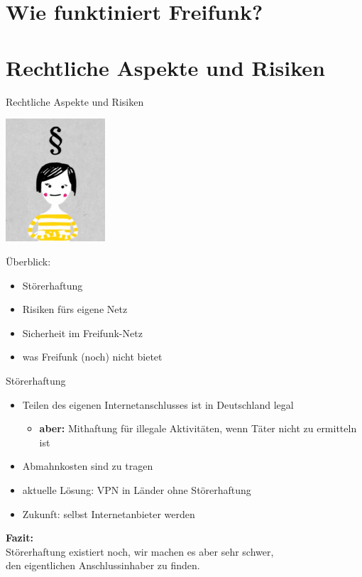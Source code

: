 \documentclass[handout]{beamer}
\begin{document}
\section{Wie funktiniert Freifunk?}

\section{Rechtliche Aspekte und Risiken}
\begin{frame}{Rechtliche Aspekte und Risiken}
\begin{Row}
\begin{Cell}{1}
\vspace{0.1cm}
\includegraphics[width=3.7cm]{images/recht}
\end{Cell}
\begin{Cell}{2}
\vspace{1cm}
Überblick:
\begin{itemize}
\pause \item Störerhaftung
\pause \item Risiken fürs eigene Netz
\pause \item Sicherheit im Freifunk-Netz
\pause \item was Freifunk (noch) nicht bietet
\end{itemize}
\end{Cell}
\end{Row}
\end{frame}

\begin{frame}{Störerhaftung}
\begin{itemize}
\pause\item Teilen des eigenen Internetanschlusses ist in Deutschland legal
\begin{itemize}
	\pause\item \textbf{aber:} Mithaftung für illegale Aktivitäten, wenn Täter nicht zu ermitteln ist
\end{itemize}
\pause\item Abmahnkosten sind zu tragen
\vfill
\pause\item aktuelle Lösung: VPN in Länder ohne Störerhaftung
\pause\item Zukunft: selbst Internetanbieter werden
\end{itemize}
\vfill
\centering
\pause \textbf{Fazit:}\\Störerhaftung existiert noch, wir machen es aber sehr schwer,\\den eigentlichen Anschlussinhaber zu finden.

\end{frame}
\end{document}
